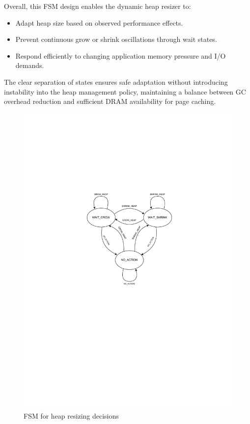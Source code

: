 \vspace{0.2cm}

\noindent Overall, this FSM design enables the dynamic heap resizer to:
\begin{itemize}
\item Adapt heap size based on observed performance effects.
\item Prevent continuous grow or shrink oscillations through wait states.
\item Respond efficiently to changing application memory pressure and I/O demands.
\end{itemize}

The clear separation of states ensures safe adaptation without introducing instability into the heap management policy, maintaining a balance between GC overhead reduction and sufficient DRAM availability for page caching.

\begin{figure}[htbp]
  \centering
\includegraphics[width=1.1\columnwidth]{fig/FSM.pdf}
  \caption{FSM for heap resizing decisions}
  \label{fig:fsm}
\end{figure}


